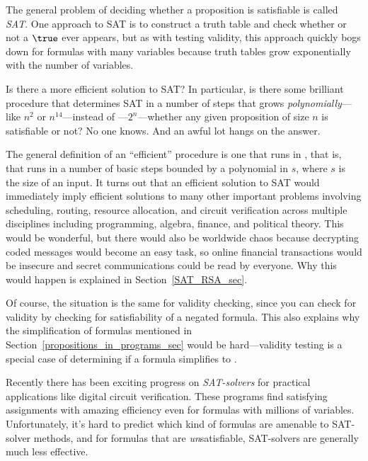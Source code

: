 The general problem of deciding whether a proposition is
satisfiable is called
\emph{SAT}.  One approach to SAT is to construct a truth table 
and check whether or not a $\true$ ever
appears, but as with testing validity, this approach quickly bogs down
for formulas with many variables because truth tables grow
exponentially with the number of variables.

Is there a more efficient solution to SAT?  In particular, is
there some brilliant procedure that determines SAT in a number of steps
that grows \emph{polynomially}---like
$n^2$ or $n^{14}$---instead of \emph{}---$2^n$---whether any given proposition of size
$n$ is satisfiable or not?  No one knows.  And an awful lot hangs on
the answer.

The general definition of an ``efficient'' procedure is one that runs
in , that is, that runs in a number of basic
steps bounded by a polynomial in $s$, where $s$ is the size of an
input.  It turns out that an efficient solution to SAT would
immediately imply efficient solutions to many other important problems
involving scheduling, routing, resource allocation, and circuit
verification across multiple disciplines including programming,
algebra, finance, and political theory.  This would be wonderful, but
there would also be worldwide chaos because decrypting coded messages
would become an easy task, so online financial transactions would be
insecure and secret communications could be read by everyone.  Why
this would happen is explained in Section~\ref{SAT_RSA_sec}.

Of course, the situation is the same for validity  checking, since you can check for validity by checking for
satisfiability of a negated formula.  This also explains why the
simplification of formulas mentioned in
Section~\ref{propositions_in_programs_sec} would be hard---validity
testing is a special case of determining if a formula simplifies to
\true.

Recently there has been exciting progress on \emph{SAT-solvers}
 for practical applications like
digital circuit verification.  These programs find satisfying
assignments with amazing efficiency even for formulas with millions of
variables.  Unfortunately, it's hard to predict which kind of formulas
are amenable to SAT-solver methods, and for formulas that are
\emph{un}satisfiable, SAT-solvers are generally much less effective.

